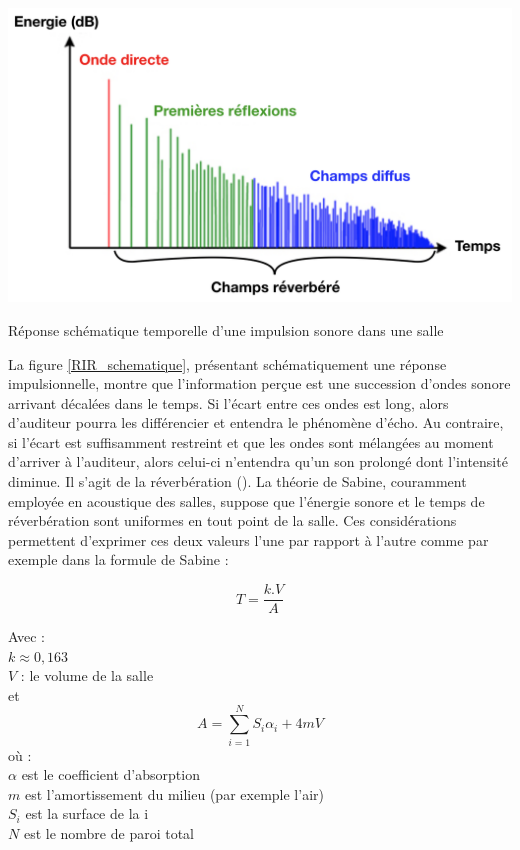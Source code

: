 \begin{figureth}
	\includegraphics[width=\linewidth]{images/RIR_schematique}
	\caption{Réponse schématique temporelle d'une impulsion sonore dans une salle}
	\label{RIR_schematique}
\end{figureth}

La figure \ref{RIR_schematique}, présentant schématiquement une réponse impulsionnelle, montre que l'information perçue est une succession d'ondes sonore arrivant décalées dans le temps. Si l'écart entre ces ondes est long, alors d'auditeur pourra les différencier et entendra le phénomène d'écho. Au contraire, si l'écart est suffisamment restreint et que les ondes sont mélangées au moment d'arriver à l'auditeur, alors celui-ci n'entendra qu'un son prolongé dont l'intensité diminue. Il s'agit de la réverbération (\cite{sabine}). La théorie de Sabine, couramment employée en acoustique des salles, suppose que l’énergie sonore et le temps de réverbération sont uniformes en tout point de la salle. Ces considérations permettent d'exprimer ces deux valeurs l'une par rapport à l'autre comme par exemple dans la formule de Sabine : 

\begin{equation}
   	T = \frac{k.V}{A}
\end{equation}

Avec : \\
$k \approx 0,163$ \\
$V$ : le volume de la salle\\
et
\begin{equation}
   	A = \sum_{i=1}^N S_{i}\alpha_{i} + 4mV
\end{equation}
où : \\
$\alpha$ est le coefficient d'absorption \\
$m$ est l'amortissement du milieu (par exemple l'air) \\
$S_{i}$ est la surface de la i \\
$N$ est le nombre de paroi total \\

